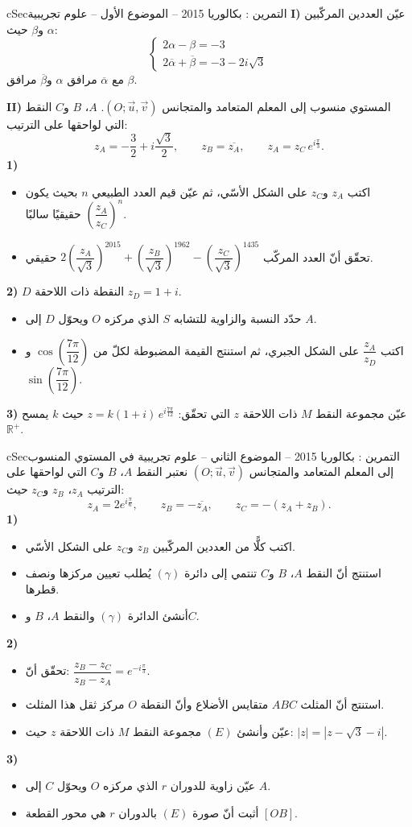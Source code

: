 \documentclass[12pt,a4paper]{article}
\newenvironment{BOX}[2]{\begin{otherlanguage}{english}\begin{arbox}{#1}{#2}}{\end{arbox}\end{otherlanguage}}
\newcounter{exo}
\newenvironment{tamrin}[1]{\stepcounter{exo}\begin{BOX}{cSec}{التمرين \theexo: #1}}{\end{BOX}}
\newcommand{\R}{\mathbb{R}}
\newenvironment{sq}{\begin{itemize}[leftmargin=2.4em,itemsep=3pt]}{\end{itemize}}
\newcommand{\qa}{\item[(أ)]}\newcommand{\qb}{\item[(ب)]}\newcommand{\qc}{\item[(جـ)]}\newcommand{\qd}{\item[(د)]}\newcommand{\qe}{\item[(هـ)]}
\begin{document}
\begin{tamrin}{بكالوريا 2015 -- الموضوع الأول -- علوم تجريبية}
\textbf{I)} عيّن العددين المركّبين $\alpha$ و$\beta$ حيث:
\[\begin{cases}2\alpha-\beta=-3\\[2pt] 2\overline{\alpha}+\overline{\beta}=-3-2i\sqrt3\end{cases}\]
مع $\overline{\alpha}$ مرافق $\alpha$ و$\overline{\beta}$ مرافق $\beta$.

\textbf{II)} المستوي منسوب إلى المعلم المتعامد والمتجانس $(O;\vec u,\vec v)$. $A$، $B$ و$C$ النقط التي لواحقها على الترتيب:
\[z_A=-\frac32+i\frac{\sqrt3}{2},\qquad z_B=\overline{z_A},\qquad z_A=z_C\,e^{i\frac{\pi}{3}}.\]
\textbf{1)}
\begin{sq}
\qa اكتب $z_A$ و$z_C$ على الشكل الأسّي، ثم عيّن قيم العدد الطبيعي $n$ بحيث يكون $\left(\dfrac{z_A}{z_C}\right)^{n}$ حقيقيًا سالبًا.
\qb تحقّق أنّ العدد المركّب $2\left(\dfrac{z_A}{\sqrt3}\right)^{2015}+\left(\dfrac{z_B}{\sqrt3}\right)^{1962}-\left(\dfrac{z_C}{\sqrt3}\right)^{1435}$ حقيقي.
\end{sq}
\textbf{2)} $D$ النقطة ذات اللاحقة $z_D=1+i$.
\begin{sq}
\qa حدّد النسبة والزاوية للتشابه $S$ الذي مركزه $O$ ويحوّل $D$ إلى $A$.
\qb اكتب $\dfrac{z_A}{z_D}$ على الشكل الجبري، ثم استنتج القيمة المضبوطة لكلّ من $\cos\left(\dfrac{7\pi}{12}\right)$ و$\sin\left(\dfrac{7\pi}{12}\right)$.
\end{sq}
\textbf{3)} عيّن مجموعة النقط $M$ ذات اللاحقة $z$ التي تحقّق: $z=k(1+i)\,e^{i\frac{7\pi}{12}}$ حيث $k$ يمسح $\R^{+}$.
\end{tamrin}

\begin{tamrin}{بكالوريا 2015 -- الموضوع الثاني -- علوم تجريبية}
في المستوي المنسوب إلى المعلم المتعامد والمتجانس $(O;\vec u,\vec v)$ نعتبر النقط $A$، $B$ و$C$ التي لواحقها على الترتيب $z_A$، $z_B$ و$z_C$ حيث:
\[z_A=2e^{i\frac{\pi}{6}},\qquad z_B=-\overline{z_A},\qquad z_C=-(z_A+z_B).\]
\textbf{1)}
\begin{sq}
\qa اكتب كلًّا من العددين المركّبين $z_B$ و$z_C$ على الشكل الأسّي.
\qb استنتج أنّ النقط $A$، $B$ و$C$ تنتمي إلى دائرة $(\gamma)$ يُطلب تعيين مركزها ونصف قطرها.
\qc أنشئ الدائرة $(\gamma)$ والنقط $A$، $B$ و$C$.
\end{sq}
\textbf{2)}
\begin{sq}
\qa تحقّق أنّ: $\dfrac{z_B-z_C}{z_B-z_A}=e^{-i\frac{\pi}{3}}$.
\qb استنتج أنّ المثلث $ABC$ متقايس الأضلاع وأنّ النقطة $O$ مركز ثقل هذا المثلث.
\qc عيّن وأنشئ $(E)$ مجموعة النقط $M$ ذات اللاحقة $z$ حيث: $|z|=\left|z-\sqrt3-i\right|$.
\end{sq}
\textbf{3)}
\begin{sq}
\qa عيّن زاوية للدوران $r$ الذي مركزه $O$ ويحوّل $C$ إلى $A$.
\qb أثبت أنّ صورة $(E)$ بالدوران $r$ هي محور القطعة $[OB]$.
\end{sq}
\end{tamrin}
\end{document}
